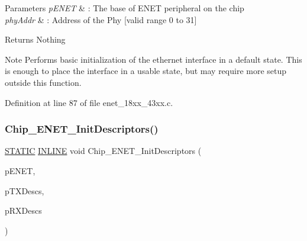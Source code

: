 \begin{DoxyParams}{Parameters}
{\em p\+E\+N\+ET} & \+: The base of E\+N\+ET peripheral on the chip \\
\hline
{\em phy\+Addr} & \+: Address of the Phy \mbox{[}valid range 0 to 31\mbox{]} \\
\hline
\end{DoxyParams}
\begin{DoxyReturn}{Returns}
Nothing 
\end{DoxyReturn}
\begin{DoxyNote}{Note}
Performs basic initialization of the ethernet interface in a default state. This is enough to place the interface in a usable state, but may require more setup outside this function. 
\end{DoxyNote}


Definition at line 87 of file enet\+\_\+18xx\+\_\+43xx.\+c.

\mbox{\label{group___e_n_e_t__18_x_x__43_x_x_ga11da2fb0538560adec98ab13199aa267}} 
\subsubsection{\texorpdfstring{Chip\+\_\+\+E\+N\+E\+T\+\_\+\+Init\+Descriptors()}{Chip\_ENET\_InitDescriptors()}}
{\footnotesize\ttfamily \hyperlink{group___l_p_c___types___public___macros_ga10b2d890d871e1489bb02b7e70d9bdfb}{S\+T\+A\+T\+IC} \hyperlink{spifi__18xx__43xx_8h_a2eb6f9e0395b47b8d5e3eeae4fe0c116}{I\+N\+L\+I\+NE} void Chip\+\_\+\+E\+N\+E\+T\+\_\+\+Init\+Descriptors (\begin{DoxyParamCaption}\item[{\hyperlink{struct_l_p_c___e_n_e_t___t}{L\+P\+C\+\_\+\+E\+N\+E\+T\+\_\+T} $\ast$}]{p\+E\+N\+ET,  }\item[{\hyperlink{struct_e_n_e_t___e_n_h_t_x_d_e_s_c___t}{E\+N\+E\+T\+\_\+\+E\+N\+H\+T\+X\+D\+E\+S\+C\+\_\+T} $\ast$}]{p\+T\+X\+Descs,  }\item[{\hyperlink{struct_e_n_e_t___e_n_h_r_x_d_e_s_c___t}{E\+N\+E\+T\+\_\+\+E\+N\+H\+R\+X\+D\+E\+S\+C\+\_\+T} $\ast$}]{p\+R\+X\+Descs }\end{DoxyParamCaption})}



